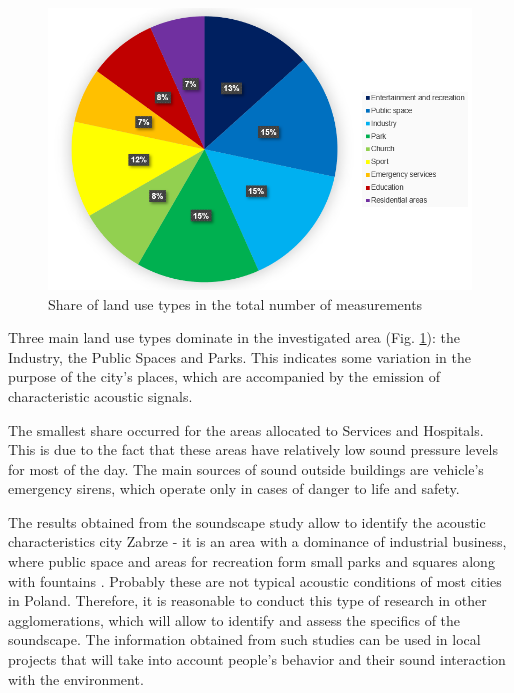 \documentclass[a4paper,10pt]{article}
\begin{document}
\begin{figure}[H]
  \includegraphics[scale=.7]{fig7.png}
  \centering
  \caption{Share of land use types in the total number of measurements}
  \label{finalChart}
\end{figure}

\begin{multicols}{2}
  Three main land use types dominate in the investigated area (Fig.
  \ref{finalChart}): the Industry, the Public Spaces and Parks. This indicates
  some variation in the purpose of the city's places, which are accompanied by
  the emission of characteristic acoustic signals.

  The smallest share occurred for the areas allocated to Services and Hospitals.
  This is due to the fact that these areas have relatively low sound pressure
  levels for most of the day. The main sources of sound outside buildings are
  vehicle's emergency sirens, which operate only in cases of danger to life and
  safety.

  The results obtained from the soundscape study allow to identify the acoustic
  characteristics city Zabrze - it is an area with a dominance of industrial
  business, where public space and areas for recreation form small parks and
  squares along with fountains \cite{Lewandowski:2008}. Probably these are not typical acoustic
  conditions of most cities in Poland. Therefore, it is reasonable to conduct
  this type of research in other agglomerations, which will allow to identify
  and assess the specifics of the soundscape. The information obtained from such
  studies can be used in local projects that will take into account people's
  behavior and their sound interaction with the environment.
\end{multicols}
\end{document}
